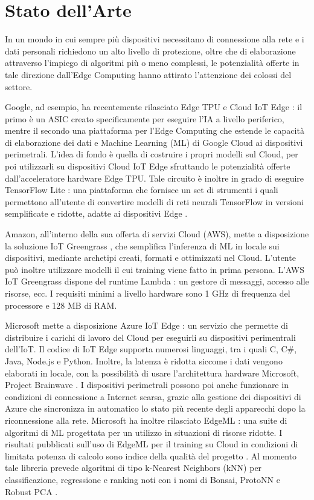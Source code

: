 \chapter{Stato dell'Arte}
In un mondo in cui sempre più dispositivi necessitano di connessione alla rete e i dati personali richiedono un alto livello di protezione, oltre che di elaborazione attraverso l'impiego di algoritmi più o meno complessi, le potenzialità offerte in tale direzione dall'Edge Computing hanno attirato l'attenzione dei colossi del settore.

Google, ad esempio, ha recentemente rilasciato Edge TPU e Cloud IoT Edge \cite{iotgoogle}: il primo è un ASIC creato specificamente per eseguire l'IA a livello periferico, mentre il secondo una piattaforma per l'Edge Computing che estende le capacità di elaborazione dei dati e Machine Learning (ML) di Google Cloud ai dispositivi perimetrali. L'idea di fondo è quella di costruire i propri modelli sul Cloud, per poi utilizzarli su dispositivi Cloud IoT Edge sfruttando le potenzialità offerte dall'acceleratore hardware Edge TPU. Tale circuito è inoltre in grado di eseguire TensorFlow Lite \cite{tflowlite}: una piattaforma che fornisce un set di strumenti i quali permettono all'utente di convertire modelli di reti neurali TensorFlow in versioni semplificate e ridotte, adatte ai dispositivi Edge \cite{tflowres}.

Amazon, all'interno della sua offerta di servizi Cloud (AWS), mette a disposizione la soluzione IoT Greengrass \cite{aws}, che semplifica l'inferenza di ML in locale sui dispositivi, mediante archetipi creati, formati e ottimizzati nel Cloud. L'utente può inoltre utilizzare modelli il cui training viene fatto in prima persona. L'AWS IoT Greengrass dispone del runtime Lambda \cite{lambda}: un gestore di messaggi, accesso alle risorse, ecc. I requisiti minimi a livello hardware sono 1 GHz di frequenza del processore e 128 MB di RAM.

Microsoft mette a disposizione Azure IoT Edge \cite{azure}: un servizio che permette di distribuire i carichi di lavoro del Cloud per eseguirli su dispositivi perimentrali dell'IoT. Il codice di IoT Edge supporta numerosi linguaggi, tra i quali C, C\#, Java, Node.js e Python. Inoltre, la latenza è ridotta siccome i dati vengono elaborati in locale, con la possibilità di usare l'architettura hardware Microsoft, Project Brainwave \cite{bwave}. I dispositivi perimetrali possono poi anche funzionare in condizioni di connessione a Internet scarsa, grazie alla gestione dei dispositivi di Azure che sincronizza in automatico lo stato più recente degli apparecchi dopo la riconnessione alla rete. Microsoft ha inoltre rilasciato EdgeML \cite{edgeml}: una suite di algoritmi di ML progettata per un utilizzo in situazioni di risorse ridotte. I risultati pubblicati sull'uso di EdgeML per il training su Cloud in condizioni di limitata potenza di calcolo sono indice della qualità del progetto \cite{edgemlres}. Al momento tale libreria prevede algoritmi di tipo k-Nearest Neighbors (kNN) per classificazione, regressione e ranking noti con i nomi di Bonsai, ProtoNN e Robust PCA \cite{edgemlalg}.


